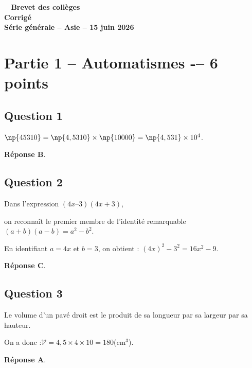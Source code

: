 \documentclass[12pt,a4paper,french]{article}
\begin{document}
	\pagestyle{fancy}

	\thispagestyle{empty}


	\begin{center}
		{\Large \textbf{\decofourleft~ Brevet des collèges ~\decofourright\\[10pt]Corrigé\\[10pt]  Série générale -- Asie -- 15 juin 2026 }}
	\end{center}



\section*{Partie 1 -- Automatismes -– 6 points}

	\subsection*{Question 1}
		$\np{45310}=\np{4,5310}\times \np{10000}=\np{4,531}\times 10^4$.

		\textbf{Réponse B}.

	\subsection*{Question 2}
		Dans l'expression \quad $(4x – 3)(4x + 3)$,

		on reconnaît le premier membre de l'identité remarquable \quad $(a+b)(a-b)=a^2-b^2$.

		En identifiant $a=4x$ et $b=3$, on obtient : \quad $(4x)^2-3^2=16x^2-9$.

		\textbf{Réponse C}.

	\subsection*{Question 3}
		Le volume d'un pavé droit est le produit de sa longueur par sa largeur par sa hauteur.

		On a donc :\quad $\mathcal{V}=4,5\times 4\times 10={180}$(cm$^3$).

		\textbf{Réponse A}.
\end{document}
